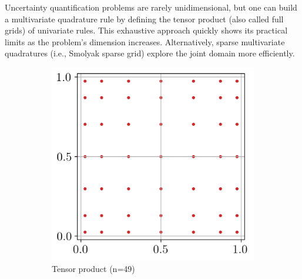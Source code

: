 Uncertainty quantification problems are rarely unidimensional, but one can build a multivariate quadrature rule by defining the tensor product (also called full grids) of univariate rules. 
This exhaustive approach quickly shows its practical limits as the problem's dimension increases. 
Alternatively, sparse multivariate quadratures (i.e., Smolyak sparse grid) explore the joint domain more efficiently. 


\begin{figure}[h!]
    \centering
    \begin{subfigure}[b]{0.32\textwidth}
        \centering
        \includegraphics[width=\textwidth]{../numerical_experiments/chapter1/figures/tensorized_gaussian_quadrature.png}
        \caption{Tensor product (n=49)}
    \end{subfigure}
    \quad
    \begin{subfigure}[b]{0.32\textwidth}
        \centering

\end{subfigure}
\end{figure}
